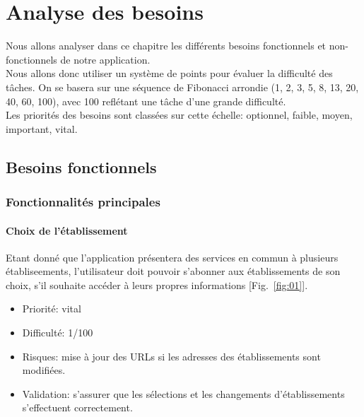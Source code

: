 \documentclass [pdftex,12pt] {report}
\begin{document}
\chapter{Analyse des besoins}

Nous allons analyser dans ce chapitre les différents besoins fonctionnels et non-fonctionnels de notre application.\\
Nous allons donc utiliser un système de points pour évaluer la difficulté des tâches. On se basera sur une séquence de Fibonacci arrondie (1, 2, 3, 5, 8, 13, 20, 40, 60, 100), avec 100 reflétant une tâche d'une grande difficulté.\\
Les priorités des besoins sont classées sur cette échelle: optionnel, faible, moyen, important, vital.
\section{Besoins fonctionnels}
\subsection{Fonctionnalités principales}
\subsubsection{Choix de l'établissement}
Etant donné que l'application présentera des services en commun à plusieurs établiseements, l'utilisateur doit pouvoir s'abonner aux établissements de son choix, s'il souhaite accéder à leurs propres informations [Fig.~\ref{fig:01}]. \\

\begin{itemize}
\renewcommand{\labelitemi}{$\bullet$}
\item Priorité: vital
\item Difficulté: 1/100
\item Risques: mise à jour des URLs si les adresses des établissements sont modifiées.
\item Validation: s'assurer que les sélections et les changements d'établissements s'effectuent correctement.
\end{itemize}
\end{document}

